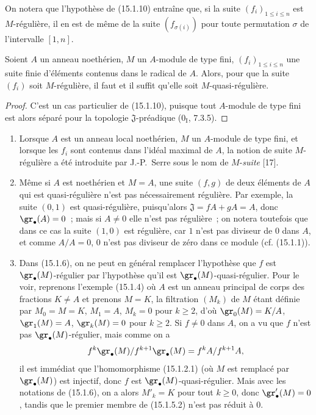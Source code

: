 On notera que l'hypothèse de (15.1.10) entraîne que, si la suite
$(f_i)_{1\leq i\leq n}$ est $M$-régulière, il en est de même de la suite
$(f_{\sigma(i)})$ pour toute permutation $\sigma$ de l'intervalle $[1,n]$.

\begin{corollary}[15.1.11]
\label{0.15.1.11-fr}
Soient $A$ un anneau noethérien, $M$ un $A$-module de type fini,
$(f_i)_{1\leq i\leq n}$ une suite finie d'éléments contenus dans le radical de
$A$. Alors, pour que la suite $(f_i)$ soit $M$-régulière, il faut et il suffit
qu'elle soit $M$-quasi-régulière.
\end{corollary}

\begin{proof}
C'est un cas particulier de (15.1.10), puisque tout $A$-module de type fini
est alors séparé pour la topologie $\mathfrak{J}$-préadique
($0_{\mathrm I}$, 7.3.5).
\end{proof}

\begin{remarks}[15.1.12]
\label{0.15.1.12-fr}
\mbox{}
\begin{enumerate}
  \item[(i)] Lorsque $A$ est un anneau local noethérien, $M$ un $A$-module de
  type fini, et lorsque les $f_i$ sont contenus dans l'idéal maximal de $A$,
  la notion de suite $M$-régulière a été introduite par J.-P.~Serre sous le
  nom de $M$-\emph{suite} [17].
  \item[(ii)] Même si $A$ est noethérien et $M=A$, une suite $(f,g)$ de deux
  éléments de $A$ qui est quasi-régulière n'est pas nécessairement régulière.
  Par exemple, la suite $(0,1)$ est quasi-régulière, puisqu'alors
  $\mathfrak{J}=fA+gA=A$, donc $\gr_\bullet(A)=0$~; mais si $A\neq0$ elle
  n'est pas régulière~; on notera toutefois que dans ce cas la suite $(1,0)$
  est régulière, car $1$ n'est pas diviseur de $0$ dans $A$, et comme
  $A/A=0$, $0$ n'est pas diviseur de zéro dans ce module (cf. (15.1.1)).
  \item[(iii)]
  Dans (15.1.6), on ne peut en général remplacer l'hypothèse que $f$ est
  $\gr_\bullet(M)$-régulier par l'hypothèse qu'il est
  $\gr_\bullet(M)$-quasi-régulier. Pour le voir, reprenons l'exemple (15.1.4)
  où $A$ est un anneau principal de corps des fractions $K\neq A$ et prenons
  $M=K$, la filtration $(M_k)$ de $M$ étant définie par
  $M_0=M=K$, $M_1=A$, $M_k=0$ pour $k\geq2$, d'où
  $\gr_0(M)=K/A$, $\gr_1(M)=A$, $\gr_k(M)=0$ pour $k\geq2$. Si $f\neq0$ dans
  $A$, on a vu que $f$ n'est pas $\gr_\bullet(M)$-régulier, mais comme on a
  \[
    f^k\gr_\bullet(M)/f^{k+1}\gr_\bullet(M)=f^kA/f^{k+1}A,
  \]
  il est immédiat que l'homomorphisme (15.1.2.1) (où $M$ est remplacé par
  $\gr_\bullet(M)$) est injectif, donc $f$ est
  $\gr_\bullet(M)$-quasi-régulier. Mais avec les notations de (15.1.6), on a
  alors $M'_k=K$ pour tout $k\geq0$, donc $\gr'_\bullet(M)=0$, tandis que le
  premier membre de (15.1.5.2) n'est pas réduit à $0$.
\end{enumerate}
\end{remarks}

